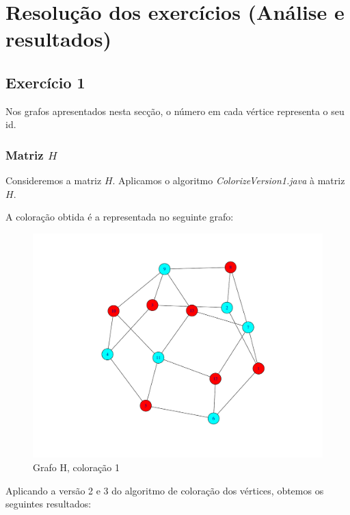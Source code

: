 \documentclass[a4paper,12pt]{report}
\begin{document}
\chapter{Resolução dos exercícios (Análise e resultados)}

\section{Exercício 1}

Nos grafos apresentados nesta secção, o número em cada vértice representa o seu id.

\subsection*{Matriz $H$}

Consideremos a matriz $H$. Aplicamos o algoritmo \textit{ColorizeVersion1.java} à matriz $H$.

A coloração obtida é a representada no seguinte grafo:

\begin{figure}[H]
    \centering
        \includegraphics[scale=0.22]{img/v1H.pdf}
    \caption{Grafo H, coloração 1}
    \label{fig:v1H}
\end{figure}

Aplicando a versão 2 e 3 do algoritmo de coloração dos vértices, obtemos os seguintes resultados:
\end{document}
